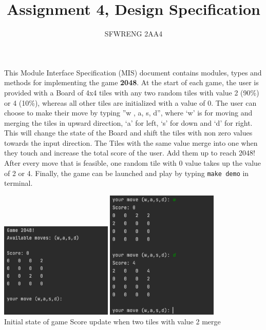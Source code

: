 \documentclass[12pt]{article}
\title{Assignment 4, Design Specification}
\author{SFWRENG 2AA4}
\begin{document}
\maketitle
This Module Interface Specification (MIS) document contains modules, types and
methods for implementing the game \textbf{2048}. At the start of each game, the user is provided with a Board of 4x4 tiles with any two random tiles with value 2 (90\%) or 4 (10\%), whereas all other tiles are initialized with a value of 0.
The user can choose to make their move by typing ”w , a, s, d”, where `w' is for moving and merging the tiles in upward direction, `a' for left, `s' for down and `d' for right. This will change the state of the Board and shift the tiles with non zero values towards the input direction. The Tiles with the same value merge
into one when they touch and increase the total score of the user. Add them up to reach 2048! After every move that is feasible, one random tile with 0
value takes up the value of 2 or 4.
Finally, the game can be launched and play by typing \texttt{make demo} in terminal.

\begin{center}
 \includegraphics[width=0.4\textwidth]{terminal-1.png}
 \hspace{1.4cm}
 \includegraphics[width=0.4\textwidth]{terminal-2.png}\\
  \hspace{1.6cm}
  Initial state of game
  \hspace{1.9cm}
  Score update when two tiles with value 2 merge
\end{center}
\end{document}

